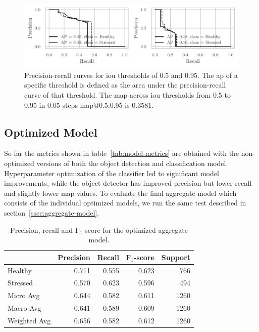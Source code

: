 \documentclass[final]{vutinfth} %
\begin{document}
\begin{figure}
  \centering
  \includegraphics{graphics/APmodel-model-optimized-relabeled.pdf}
  \caption[Aggregate model AP@0.5 and AP@0.95.]{Precision-recall
    curves for \gls{iou} thresholds of \num{0.5} and \num{0.95}. The
    \gls{ap} of a specific threshold is defined as the area under the
    precision-recall curve of that threshold. The \gls{map} across
    \gls{iou} thresholds from \num{0.5} to \num{0.95} in \num{0.05}
    steps \gls{map}@0.5:0.95 is \num{0.3581}.}
  \label{fig:aggregate-ap}
\end{figure}

\subsection{Optimized Model}
\label{ssec:model-optimized}

So far the metrics shown in table~\ref{tab:model-metrics} are obtained
with the non-optimized versions of both the object detection and
classification model. Hyperparameter optimization of the classifier
led to significant model improvements, while the object detector has
improved precision but lower recall and slightly lower \gls{map}
values. To evaluate the final aggregate model which consists of the
individual optimized models, we run the same test described in
section~\ref{ssec:aggregate-model}.

\begin{table}
  \centering
  \begin{tabular}{lrrrr}
    \toprule
    {} &  Precision &  Recall &  $\mathrm{F}_{1}$-score &  Support \\
    \midrule
    Healthy      &      0.711 &   0.555 &     0.623 &    766 \\
    Stressed     &      0.570 &   0.623 &     0.596 &    494 \\
    Micro Avg    &      0.644 &   0.582 &     0.611 &   1260 \\
    Macro Avg    &      0.641 &   0.589 &     0.609 &   1260 \\
    Weighted Avg &      0.656 &   0.582 &     0.612 &   1260 \\
    \bottomrule
  \end{tabular}
  \caption{Precision, recall and $\mathrm{F}_1$-score for the
    optimized aggregate model.}
  \label{tab:model-metrics-hyp}
\end{table}
\end{document}
